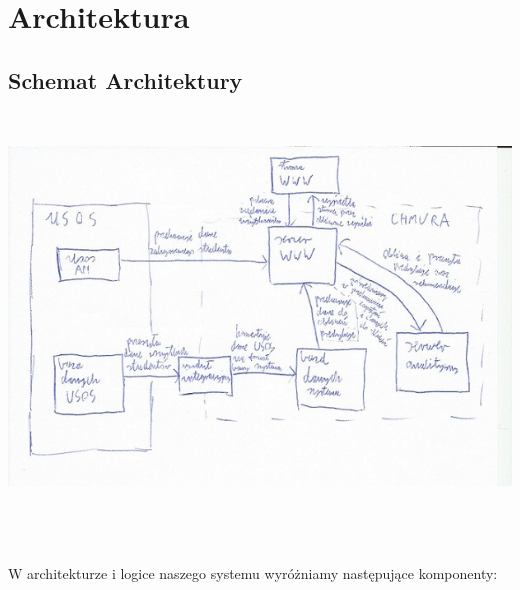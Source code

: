 \documentclass[licencjacka]{pracamgr}
\begin{document}
 \chapter{Architektura} 
\section{Schemat Architektury}
~\\
\begin{minipage}{\linewidth} 
	\centering
           \includegraphics{architekturav2.jpg}
\end{minipage} \\ \\ \\
 W architekturze i logice naszego systemu wyróżniamy następujące komponenty:
\end{document}

